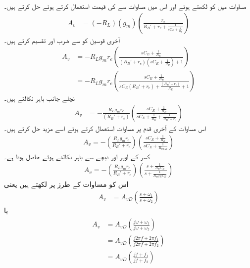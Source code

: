 مساوات   میں  کو  لکھتے ہوئے اور اس میں مساوات   سے   کی قیمت استعمال کرتے ہوئے حل کرتے ہیں۔
\begin{align*}
A_v&=\left(-R_L \right ) \left(g_m \right ) \left(\frac{r_e}{R_B'+r_e+\frac{1}{s C_E+\frac{1}{R_E}}} \right )
\end{align*}
آخری قوسین کو  سے ضرب اور تقسیم کرتے ہیں۔
\begin{align*}
A_v&=-R_L g_m r_e \left(\frac{s C_E+\frac{1}{R_E}}{\left(R_B'+r_e \right ) \left(s C_E+\frac{1}{R_E} \right )+1 } \right )\\
&=-R_L g_m r_e \left (\frac{sC_E+\frac{1}{R_E}}{sC_E(R_B'+r_e) +\frac{(R_B'+r_e)}{R_E}+1} \right )
\end{align*}
نچلے  جانب  باہر نکالتے ہیں۔
\begin{align*}
A_v&=-\frac{R_L g_m r_e}{(R_B'+r_e)} \left(\frac{sC_E+\frac{1}{R_E}}{sC_E+\frac{1}{R_E} +\frac{1}{R_B'+r_e}} \right )
\end{align*}
اس مساوات کے آخری قدم پر مساوات   استعمال کرتے ہوئے اسے مزید حل کرتے ہیں۔
\begin{align*}
A_v=-\left( \frac{R_L g_m r_e}{R_B'+r_e} \right ) \left(\frac{sC_E+\frac{1}{R_E}}{sC_E+\frac{1}{R_{mCE}}} \right )
\end{align*}
کسر کے اوپر اور نیچے سے  باہر نکالتے ہوئے حاصل ہوتا ہے۔
\begin{align}
A_v=-\left( \frac{R_L g_m r_e}{R_B'+r_e} \right ) \left(\frac{s+\frac{1}{R_E C_E}}{s+\frac{1}{R_{mCE} C_E}} \right )
\end{align}
اس کو مساوات  کے طرز پر لکھتے ہیں یعنی
\begin{align} \label{مساوات_تعددی_ردعمل_مخارج_کپیسٹر_معیاری_مساوات}
A_v&=A_{vD} \left(\frac{s+\omega_1}{s+\omega_2} \right )
\end{align}
یا
\begin{gather}
\begin{aligned} \label{مساوات_تعددی_ردعمل_مخارج_کپیسٹر_معیاری_مساوات_الف}
A_v&=A_{vD} \left(\frac{j \omega+\omega_1}{j \omega+\omega_2} \right )\\
&=A_{vD} \left(\frac{j 2 \pi f+2 \pi f_1}{j 2 \pi f+ 2 \pi f_2} \right )\\
&=A_{vD} \left(\frac{j  f+f_1}{j f+f_2} \right )\\
\end{aligned}
\end{gather}
